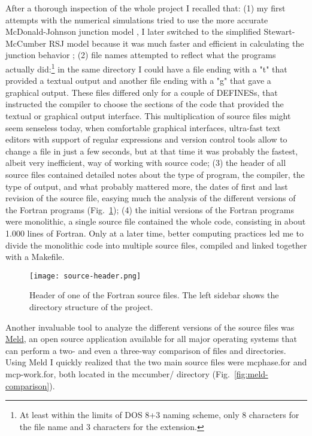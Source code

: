 After a thorough inspection of the whole project I recalled that:
(1) my first attempts with the numerical simulations tried to use the more accurate McDonald-Johnson junction model \cite{McDonald:1976}, I later switched to the simplified Stewart-McCumber RSJ model because it was much faster and efficient in calculating the junction behavior \cite{McCumber:1968, Stewart:1974};
(2) file names attempted to reflect what the programs actually did:\footnote{At least within the limits of DOS 8+3 naming scheme, only 8 characters for the file name and 3 characters for the extension.} 
in the same directory I could have a file ending with a "t" that provided a textual output and another file ending with a "g" that gave a graphical output.
These files differed only for a couple of \textsf{DEFINES}s, that instructed the compiler to choose the sections of the code that provided the textual or graphical output interface.
This multiplication of source files might seem senseless today, when comfortable graphical interfaces, ultra-fast text editors with support of regular expressions and version control tools allow to change a file in just a few seconds, but at that time it was probably the fastest, albeit very inefficient, way of working with source code;
(3) the header of all source files contained detailed notes about the type of program, the compiler, the type of output, and what probably mattered more, the dates of first and last revision of the source file, easying much the analysis of the different versions of the Fortran programs (Fig.~\ref{fig:source-header}); 
(4) the initial versions of the Fortran programs were monolithic, a single source file contained the whole code, consisting in about 1.000 lines of Fortran. Only at a later time, better computing practices led me to divide the monolithic code into multiple source files, compiled and linked together with a \textsf{Makefile}.

\begin{figure}[tb]
	\centering
	\texttt{[image: source-header.png]}
	\caption{Header of one of the Fortran source files. The left sidebar shows the directory structure of the project.}
	\label{fig:source-header}
\end{figure}


Another invaluable tool to analyze the different versions of the source files was \href{http://meldmerge.org/}{Meld}, an open source application available for all major operating systems that can perform a two- and even a three-way comparison of files and directories.
Using Meld I quickly realized that the two main source files were \textsf{mcphase.for} and \textsf{mcp-work.for}, both located in the \textsf{mccumber/} directory  (Fig.~\ref{fig:meld-comparison}).

